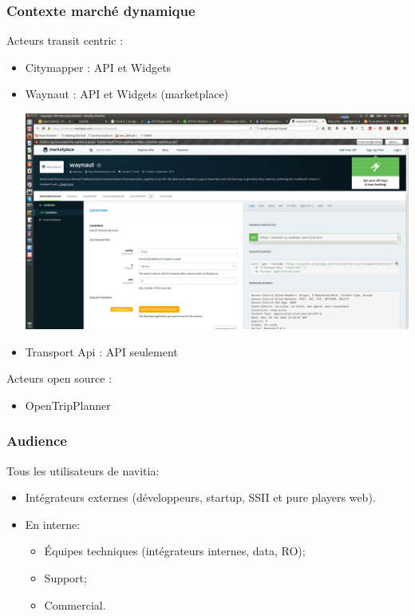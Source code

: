 \documentclass[table]{beamer}
\begin{document}
\begin{frame}
  \frametitle{Contexte marché dynamique}
  \begin{description}
    \item[Acteurs transit centric : ]
  \end{description}
  \begin{itemize}
    \item Citymapper : API et Widgets 
    \item Waynaut  :  API et Widgets (marketplace)
    \begin{center}
      \includegraphics[height=0.25\textheight]{images/Waynaut}
    \end{center}  
    \item Transport Api : API seulement
  \end{itemize}
  \begin{description}
    \item[Acteurs open source : ]
  \end{description}
  \begin{itemize}
    \item OpenTripPlanner
  \end{itemize}
\end{frame}

\begin{frame}
  \frametitle{Audience}

  Tous les utilisateurs de navitia:
  \begin{itemize}
  \item Intégrateurs externes (développeurs, startup, SSII et pure
    players web).
  \item En interne:
    \begin{itemize}
    \item Équipes techniques (intégrateurs internes, data, RO);
    \item Support;
    \item Commercial.
    \end{itemize}
  \end{itemize}
\end{frame}
\end{document}
